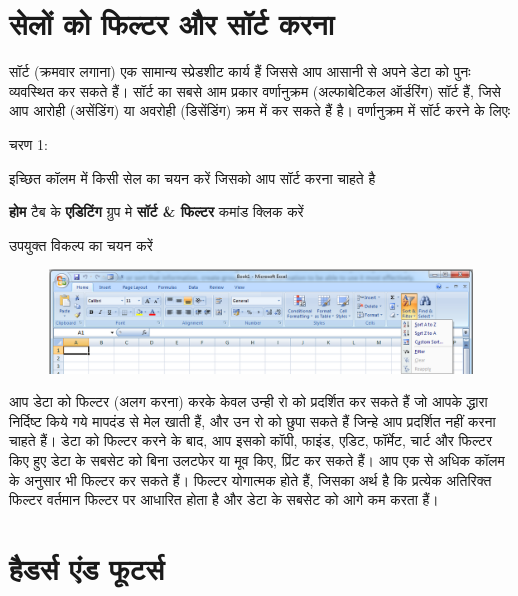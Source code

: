 \section{सेलों को फिल्टर और सॉर्ट करना}\label{id-1.22}

सॉर्ट (क्रमवार लगाना) एक सामान्य स्प्रेडशीट कार्य हैं जिससे आप आसानी से अपने डेटा को पुनः व्यवस्थित कर सकते हैं। सॉर्ट का सबसे आम प्रकार वर्णानुक्रम (अल्फाबेटिकल ऑर्डरिंग) सॉर्ट हैं, जिसे आप आरोही (असेंडिंग) या अवरोही (डिसेंडिंग) क्रम में कर सकते हैं है। वर्णानुक्रम में सॉर्ट करने के लिएः

\begin{descriptionSimple}{चरण 1:}
\item[चरण 1] इच्छित कॉलम में किसी सेल का चयन करें जिसको आप सॉर्ट करना चाहते है
\item[चरण 2] \textbf{होम} टैब के \textbf{एडिटिंग} ग्रुप मे \textbf{सॉर्ट \& फिल्टर} कमांड क्लिक करें
\item[चरण 3] उपयुक्त विकल्प का चयन करें
\end{descriptionSimple}
\begin{figure}[H]
\centering
\includegraphics[scale=0.3]{src/images/chapter1/chapter1_fig42.png}
\end{figure}

आप डेटा को फिल्टर (अलग करना) करके केवल उन्ही रो को प्रदर्शित कर सकते हैं जो आपके द्धारा निर्दिष्ट किये गये मापदंड से मेल खाती हैं, और उन रो को छुपा सकते हैं जिन्हे आप प्रदर्शित नहीं करना चाहते हैं। डेटा को फिल्टर करने के बाद, आप इसको कॉपी, फाइंड, एडिट, फॉर्मेट, चार्ट और फिल्टर किए हुए डेटा के सबसेट को बिना उलटफेर या मूव किए, प्रिंट कर सकते हैं। आप एक से अधिक कॉलम के अनुसार भी फिल्टर कर सकते हैं। फिल्टर योगात्मक होते हैं, जिसका अर्थ है कि प्रत्येक अतिरिक्त फिल्टर वर्तमान फिल्टर पर आधारित होता है और डेटा के सबसेट को आगे कम करता हैं।
\vskip -10pt

\section{हैडर्स एंड फूटर्स}\label{id-1.23}

